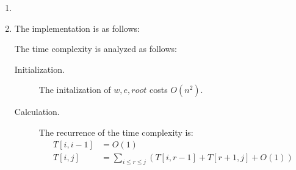 \documentclass[12pt,a4paper]{article}
\makeatletter
\newtheorem*{solution}{Solution}
\theoremstyle{definition}
\renewenvironment{solution}[1][Solution] {\par\pushQED{\qed}\normalfont\topsep6\p@\@plus6\p@\relax\trivlist\item[\hskip\labelsep\bfseries#1\@addpunct{.}]\ignorespaces}{\popQED\endtrivlist\@endpefalse} \makeatother
\providecommand{\code}[2]{}
\makeatother
\begin{document}
\begin{enumerate}
\begin{enumerate}
\begin{solution}
			\end{solution}
			\item The implementation is as follows:
			\code{Code-OBST.cpp}{c++}

			The time complexity is analyzed as follows:
			\begin{description}
				\item[Initialization.] The initalization of $w,e,root$ costs $O(n^2)$.
				\item[Calculation.] The recurrence of the time complexity is:
				\begin{align*}
					T[i,i-1] &= O(1)\\
					T[i,j] &= \sum_{i\leq r\leq j}(T[i,r-1] + T[r+1,j] + O(1))
				\end{align*} 


\end{description}
\end{enumerate}
\end{enumerate}
\end{document}
